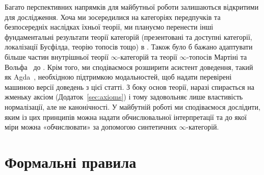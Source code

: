 \documentclass[12pt]{article}
\newcommand{\parencite}{\cite}
\begin{document}
Багато перспективних напрямків для майбутньої роботи залишаються відкритими для дослідження. Хоча ми зосередилися на категоріях передпучків та безпосередніх наслідках їхньої теорії, ми плануємо перенести інші фундаментальні результати теорії категорій (презентовані та доступні категорії, локалізації Бусфілда, теорію топосів тощо) в \STT{}. Також було б бажано адаптувати більше частин внутрішньої теорії $\infty$-категорій та теорії $\infty$-топосів Мартіні та Вольфа~\parencite{%
  martini:cocartesianfibrations:2022,%
  martini:colimitscocompletions:2021,%
  martini:phd,%
  martini:presentable:2022,%
  martini:propermorphisms:2023,%
  martini:yonedaslemma:2021,%
  wolf:phd%
  } до \STT{}. Крім того, ми сподіваємося розширити асистент доведення, такий як Agda~\parencite{agda}, необхідною підтримкою модальностей, щоб надати перевірені машиною версії доведень з цієї статті. З боку основ теорії, \STT{} наразі спирається на жменьку аксіом (Додаток~\ref{sec:axioms}) і тому задовольняє лише властивість нормалізації, але не канонічності. У майбутній роботі ми сподіваємося дослідити, яким із цих принципів можна надати обчислювальної інтерпретації та до якої міри можна «обчислювати» за допомогою синтетичних $\infty$-категорій.

\appendix

\section{Формальні правила \texorpdfstring{\MTT{}}{MTT}}
\label{sec:mtt-rules}
\end{document}
